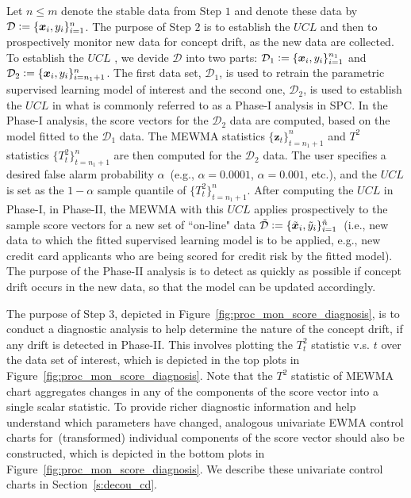 \documentclass[twoside,11pt]{article}
\begin{document}
Let $n\leq m$ denote the stable data from Step $1$ and denote these data by $\mathcal{D} \vcentcolon=\{\bm {x}_i, y_i\} _{i=1} ^{n}$. The purpose of Step $2$ is to establish the $UCL$  and then to prospectively monitor new data for concept drift, as the new data are collected. To establish the $UCL$ , we devide $\mathcal{D}$ into two parts: $ \mathcal{D}_1 \vcentcolon= \{\bm {x}_i, y_i\} _{i=1} ^{n_1}$ and $\mathcal{D}_2 \vcentcolon= \{\bm {x}_i, y_i\} _{i=n_1+1} ^{n}$. The first data set, $\mathcal{D}_1$, is used to retrain the parametric supervised learning model of interest and the second one, $\mathcal{D}_2$, is used to establish the $UCL$  in what is commonly referred to as a Phase-I analysis in SPC. In the Phase-I analysis, the score vectors for the $\mathcal{D}_2$ data are computed, based on the model fitted to the $\mathcal{D}_1$ data. The MEWMA statistics $\{\bm{z}_t\}_{t=n_1+1}^n$ and $T^2$ statistics $\{T_t^2\}_{t=n_1+1}^n$ are then computed for the $\mathcal{D}_2$ data. The user specifies a desired false alarm probability $\alpha$~(e.g., $\alpha=0.0001$, $\alpha=0.001$, etc.), and the $UCL$  is set as the $1-\alpha$ sample quantile of $\{T_t^2\}_{t=n_1+1}^n$. After computing the $UCL$  in Phase-I, in Phase-II, the MEWMA with this $UCL$  applies prospectively to the sample score vectors for a new set of ``on-line" data $\tilde{\mathcal{D}}\vcentcolon=\{\tilde{\bm{x}}_i,\tilde{y}_i\}_{i = 1}^{\tilde{n}}$~(i.e., new data to which the fitted supervised learning model is to be applied, e.g., new credit card applicants who are being scored for credit risk by the fitted model). The purpose of the Phase-II analysis is to detect as quickly as possible if concept drift occurs in the new data, so that the model can be updated accordingly. 

The purpose of Step $3$, depicted in Figure~\ref{fig:proc_mon_score_diagnosis}, is to conduct a diagnostic analysis to help determine the nature of the concept drift, if any drift is detected in Phase-II. This involves plotting the $T_t^2$ statistic v.s. $t$ over the data set of interest, which is depicted in the top plots in Figure~\ref{fig:proc_mon_score_diagnosis}. Note that the $T^2$ statistic of MEWMA chart aggregates changes in any of the components of the score vector into a single scalar statistic. To provide richer diagnostic information and help understand which parameters have changed, analogous univariate EWMA control charts for~(transformed) individual components of the score vector should also be constructed, which is depicted in the bottom plots in Figure~\ref{fig:proc_mon_score_diagnosis}. We describe these univariate control charts in Section~\ref{s:decou_cd}.
\end{document}
